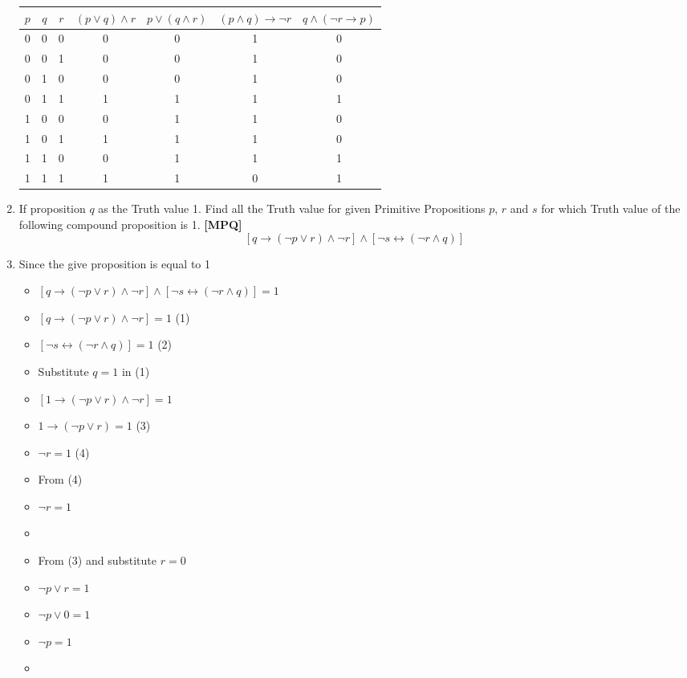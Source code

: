 \documentclass{article}
\newcommand{\answer}{\item [$\rightarrow$]}
\begin{document}
\begin{enumerate}[label=\arabic*. ]
\begin{center}
				\begin{tabular}{|c|c|c|c|c|c|c|} \hline
					$p$ & $q$ & $r$ & $(p\lor q)\land r$ & $p\lor(q\land r)$ &
					$(p\land q)\to\neg r$ & $q\land(\neg r\to p)$ \\ \hline
					0 & 0 & 0 & 0 & 0 & 1 & 0 \\
					0 & 0 & 1 & 0 & 0 & 1 & 0 \\
					0 & 1 & 0 & 0 & 0 & 1 & 0 \\
					0 & 1 & 1 & 1 & 1 & 1 & 1 \\
					1 & 0 & 0 & 0 & 1 & 1 & 0 \\
					1 & 0 & 1 & 1 & 1 & 1 & 0 \\
					1 & 1 & 0 & 0 & 1 & 1 & 1 \\
					1 & 1 & 1 & 1 & 1 & 0 & 1 \\ \hline
				\end{tabular}
			\end{center}
		\item If proposition $q$ as the Truth value 1. Find all the Truth value for given Primitive
			Propositions
			$p$, $r$ and $s$ for which Truth value of the following compound proposition is 1.
			\textbf{[MPQ]}
			$$[q\to(\neg p\lor r)\land\neg r]\land[\neg s\leftrightarrow(\neg r\land q)]$$
		\answer Since the give proposition is equal to 1
			\begin{itemize}[label=$\Longrightarrow$ ]
				\item $[q\to(\neg p\lor r)\land\neg r]
					\land[\neg s\leftrightarrow(\neg r\land q)]=1$
				\item $[q\to(\neg p\lor r)\land\neg r]=1$ \hfill (1)
				\item $[\neg s\leftrightarrow(\neg r\land q)]=1$ \hfill (2)
				\item [] Substitute $q=1$ in (1)
				\item $[1\to(\neg p\lor r)\land\neg r]=1$
				\item $1\to(\neg p\lor r)=1$ \hfill (3)
				\item $\neg r=1$ \hfill (4)
				\item [] From (4)
				\item $\neg r=1$
				\item {}
				\item [] From (3) and substitute $r=0$
				\item $\neg p\lor r=1$
				\item $\neg p\lor 0=1$
				\item $\neg p=1$
				\item {}

\end{itemize}
\end{enumerate}
\end{document}
